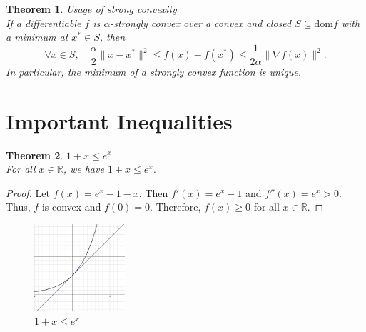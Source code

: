 \documentclass[11pt]{book} %
\newtheorem{theorem}{Theorem}[section]
\begin{document}
\begin{theorem} {Usage of strong convexity } \\
If a differentiable \( f \) is \(\alpha\)-strongly convex over a convex and closed \( S \subseteq \text{dom} f \) with a minimum at \( x^* \in S \), then
\[
\forall x \in S, \quad \frac{\alpha}{2} \|x - x^*\|^2 \leq f(x) - f(x^*) \leq \frac{1}{2\alpha} \|\nabla f(x)\|^2.
\]
In particular, the minimum of a strongly convex function is unique.
\end{theorem}




\section{Important Inequalities}

\begin{theorem}{$1 + x \leq e^x$} \\
For all $x \in \mathbb{R}$, we have $1 + x \leq e^x$.    
\end{theorem}

\begin{proof}
Let $f(x) = e^x - 1 - x$. Then $f'(x) = e^x - 1$ and $f''(x) = e^x > 0$. Thus, $f$ is convex and $f(0) = 0$. Therefore, $f(x) \geq 0$ for all $x \in \mathbb{R}$.
\end{proof}

\begin{figure}[H]
    \centering
    \includegraphics[width=0.3\textwidth]{Figs/1+x_leq_e^x.png}
    \caption{$1 + x \leq e^x$}
\end{figure}
\end{document}
